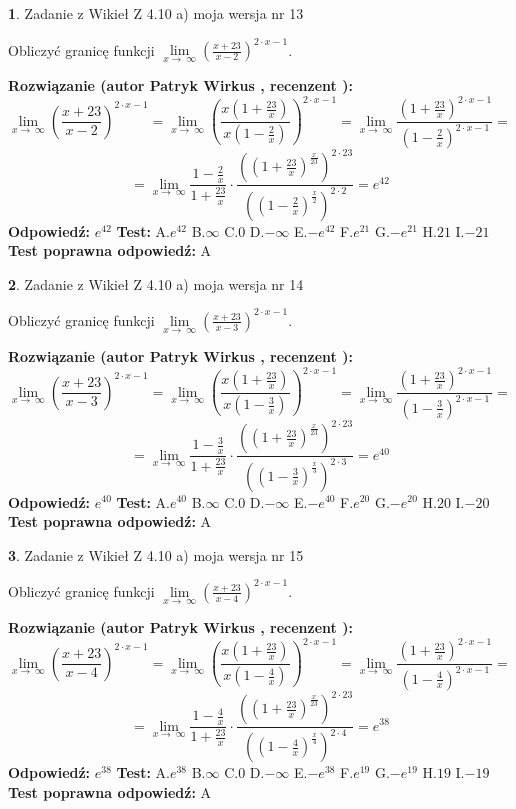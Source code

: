 \documentclass[12pt, a4paper]{article}
\theoremstyle{definition} %
\newtheorem{zad}{}
\newcommand{\zadStart}[1]{\begin{zad}#1\newline}
\newcommand{\zadStop}{\end{zad}}
\newcommand{\rozwStart}[2]{\noindent \textbf{Rozwiązanie (autor #1 , recenzent #2): }\newline}
\newcommand{\rozwStop}{\newline}
\newcommand{\odpStart}{\noindent \textbf{Odpowiedź:}\newline}
\newcommand{\odpStop}{\newline}
\newcommand{\testStart}{\noindent \textbf{Test:}\newline}
\newcommand{\testStop}{\newline}
\newcommand{\kluczStart}{\noindent \textbf{Test poprawna odpowiedź:}\newline}
\newcommand{\kluczStop}{\newline}
\begin{document}
\zadStart{Zadanie z Wikieł Z 4.10 a) moja wersja nr 13}

Obliczyć granicę funkcji  $\lim\limits_{x\to\ \infty}(\frac{x+23}{x-2})^{2\cdot x-1}$.
\zadStop
\rozwStart{Patryk Wirkus}{}
$$\lim\limits_{x\to\ \infty}(\frac{x+23}{x-2})^{2\cdot x-1} = \lim\limits_{x\to\ \infty}(\frac{x(1+\frac{23}{x})}{x(1-\frac{2}{x})})^{2\cdot x-1}=\lim\limits_{x\to\ \infty}\frac{(1+\frac{23}{x})^{2\cdot x-1}}{(1-\frac{2}{x})^{2\cdot x-1}}=$$
$$=\lim\limits_{x\to\ \infty}\frac{1-\frac{2}{x}}{1+\frac{23}{x}}\cdot\frac{((1+\frac{23}{x})^{\frac{x}{23}})^{2\cdot23}}{((1-\frac{2}{x})^{\frac{x}{2}})^{2\cdot2}}=e^{42}$$
\rozwStop
\odpStart
$e^{42}$
\odpStop
\testStart
A.$e^{42}$ B.$\infty$ C.$0$ D.$-\infty$ E.$-e^{42}$
F.$e^{21}$ G.$-e^{21}$
H.$21$
I.$-21$
\testStop
\kluczStart
A
\kluczStop



\zadStart{Zadanie z Wikieł Z 4.10 a) moja wersja nr 14}

Obliczyć granicę funkcji  $\lim\limits_{x\to\ \infty}(\frac{x+23}{x-3})^{2\cdot x-1}$.
\zadStop
\rozwStart{Patryk Wirkus}{}
$$\lim\limits_{x\to\ \infty}(\frac{x+23}{x-3})^{2\cdot x-1} = \lim\limits_{x\to\ \infty}(\frac{x(1+\frac{23}{x})}{x(1-\frac{3}{x})})^{2\cdot x-1}=\lim\limits_{x\to\ \infty}\frac{(1+\frac{23}{x})^{2\cdot x-1}}{(1-\frac{3}{x})^{2\cdot x-1}}=$$
$$=\lim\limits_{x\to\ \infty}\frac{1-\frac{3}{x}}{1+\frac{23}{x}}\cdot\frac{((1+\frac{23}{x})^{\frac{x}{23}})^{2\cdot23}}{((1-\frac{3}{x})^{\frac{x}{3}})^{2\cdot3}}=e^{40}$$
\rozwStop
\odpStart
$e^{40}$
\odpStop
\testStart
A.$e^{40}$ B.$\infty$ C.$0$ D.$-\infty$ E.$-e^{40}$
F.$e^{20}$ G.$-e^{20}$
H.$20$
I.$-20$
\testStop
\kluczStart
A
\kluczStop



\zadStart{Zadanie z Wikieł Z 4.10 a) moja wersja nr 15}

Obliczyć granicę funkcji  $\lim\limits_{x\to\ \infty}(\frac{x+23}{x-4})^{2\cdot x-1}$.
\zadStop
\rozwStart{Patryk Wirkus}{}
$$\lim\limits_{x\to\ \infty}(\frac{x+23}{x-4})^{2\cdot x-1} = \lim\limits_{x\to\ \infty}(\frac{x(1+\frac{23}{x})}{x(1-\frac{4}{x})})^{2\cdot x-1}=\lim\limits_{x\to\ \infty}\frac{(1+\frac{23}{x})^{2\cdot x-1}}{(1-\frac{4}{x})^{2\cdot x-1}}=$$
$$=\lim\limits_{x\to\ \infty}\frac{1-\frac{4}{x}}{1+\frac{23}{x}}\cdot\frac{((1+\frac{23}{x})^{\frac{x}{23}})^{2\cdot23}}{((1-\frac{4}{x})^{\frac{x}{4}})^{2\cdot4}}=e^{38}$$
\rozwStop
\odpStart
$e^{38}$
\odpStop
\testStart
A.$e^{38}$ B.$\infty$ C.$0$ D.$-\infty$ E.$-e^{38}$
F.$e^{19}$ G.$-e^{19}$
H.$19$
I.$-19$
\testStop
\kluczStart
A
\kluczStop
\end{document}
